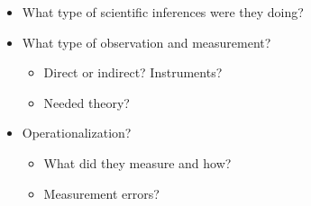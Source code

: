\begin{frame}
  \begin{question}
    \begin{itemize}
      \item What type of scientific inferences were they doing?
    \end{itemize}
  \end{question}

  \begin{question}
    \begin{itemize}
      \item What type of observation and measurement?
        \begin{itemize}
          \item Direct or indirect? Instruments?
          \item Needed theory?
        \end{itemize}
    \end{itemize}
  \end{question}

  \begin{question}
    \begin{itemize}
      \item Operationalization?
        \begin{itemize}
          \item What did they measure and how?
          \item Measurement errors?
        \end{itemize}
    \end{itemize}
  \end{question}
\end{frame}

